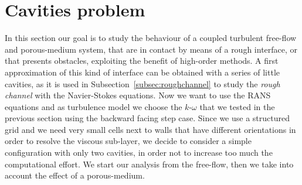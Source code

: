 \section{Cavities problem}
In this section our goal is to study the behaviour of a coupled turbulent free-flow and 
porous-medium system, that are in contact by means of a rough interface, or that presents 
obstacles, exploiting the benefit of high-order methods. A first approximation of this kind of interface can be obtained with a series of little
cavities, as it is used in Subsection~\ref{subsec:roughchannel} to study the \emph{rough channel} with the 
Navier-Stokes equations. Now we want to use the RANS equations and as 
turbulence model we choose the $k\text{-}\omega$ that we tested in the previous section using the backward facing step case.
Since we use a structured grid and we need very small cells next to walls that have different orientations in order to resolve the viscous sub-layer, we decide to consider a simple configuration with only two cavities, in order not to increase too much the computational effort. We start our analysis from the free-flow, then we take into account the effect of a porous-medium.
%
